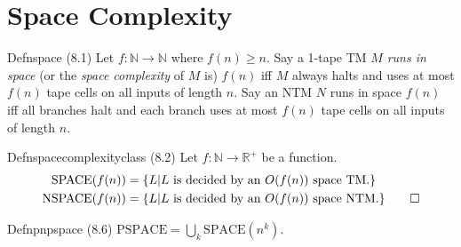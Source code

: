 \chapter{Space Complexity}

\begin{reference}{Defn}{space}
  (8.1) Let $f:\mathbb N\to \mathbb N$ where $f(n)\geq n$. Say a 1-tape TM $M$ \emph{runs in space} (or the \emph{space complexity} of $M$ is) $f(n)$ iff $M$ always halts and uses at most $f(n)$ tape cells on all inputs of length $n$. Say an NTM $N$ runs in space $f(n)$ iff all branches halt and each branch uses at most $f(n)$ tape cells on all inputs of length $n$.
\end{reference}

\begin{reference}{Defn}{spacecomplexityclass}
  (8.2) Let $f:\mathbb N\to \mathbb R^+$ be a function.
  \begin{align*}
    \mathrm{SPACE}(f(n))  & =\{L|L\text{ is decided by an }O(f(n))\text{ space TM.}\}          \\
    \mathrm{NSPACE}(f(n)) & =\{L|L\text{ is decided by an }O(f(n))\text{ space NTM.}\}\qedhere
  \end{align*}
\end{reference}

\begin{reference}{Defn}{pnpspace}
  (8.6) $\mathrm{PSPACE}=\bigcup_k \mathrm{SPACE}(n^k).$
\end{reference}
